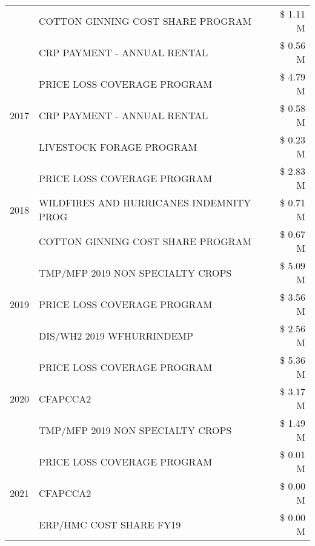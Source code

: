 \begin{tabular}{llr}
 & COTTON GINNING COST SHARE PROGRAM             & \$ 1.11 M \\
 & CRP PAYMENT - ANNUAL RENTAL                   & \$ 0.56 M \\
\cline{1-3}
\multirow[t]{3}{*}{2017} & PRICE LOSS COVERAGE PROGRAM & \$ 4.79 M \\
 & CRP PAYMENT - ANNUAL RENTAL & \$ 0.58 M \\
 & LIVESTOCK FORAGE PROGRAM & \$ 0.23 M \\
\cline{1-3}
\multirow[t]{3}{*}{2018} & PRICE LOSS COVERAGE PROGRAM & \$ 2.83 M \\
 & WILDFIRES AND HURRICANES INDEMNITY PROG & \$ 0.71 M \\
 & COTTON GINNING COST SHARE PROGRAM & \$ 0.67 M \\
\cline{1-3}
\multirow[t]{3}{*}{2019} & TMP/MFP 2019 NON SPECIALTY CROPS & \$ 5.09 M \\
 & PRICE LOSS COVERAGE PROGRAM & \$ 3.56 M \\
 & DIS/WH2 2019 WFHURRINDEMP & \$ 2.56 M \\
\cline{1-3}
\multirow[t]{3}{*}{2020} & PRICE LOSS COVERAGE PROGRAM & \$ 5.36 M \\
 & CFAPCCA2 & \$ 3.17 M \\
 & TMP/MFP 2019 NON SPECIALTY CROPS & \$ 1.49 M \\
\cline{1-3}
\multirow[t]{3}{*}{2021} & PRICE LOSS COVERAGE PROGRAM & \$ 0.01 M \\
 & CFAPCCA2 & \$ 0.00 M \\
 & ERP/HMC COST SHARE FY19 & \$ 0.00 M \\
\cline{1-3}
\bottomrule
\end{tabular}

